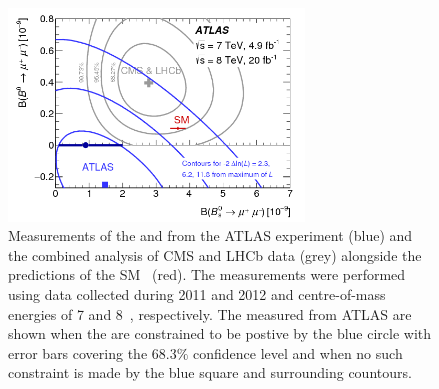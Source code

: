 \begin{figure}[tbp]
    \centering
        \includegraphics[width=0.7\textwidth]{./Figs/Introduction/contour_plot.png}
        \caption{Measurements of the \bdmumu \BF and \bsmumu \BF from the ATLAS experiment (blue) and the combined analysis of CMS and LHCb data (grey) alongside the predictions of the SM~\cite{Aaboud:2016ire} (red). The measurements were performed using data collected during 2011 and 2012 and centre-of-mass energies of 7 and 8~\tev, respectively. The measured \BFs from ATLAS are shown when the \BFs are constrained to be postive by the blue circle with error bars covering the 68.3$\%$ confidence level and when no such constraint is made by the blue square and surrounding countours.}
        \label{fig:atlasCMSLHCbcomparison}
\end{figure}

